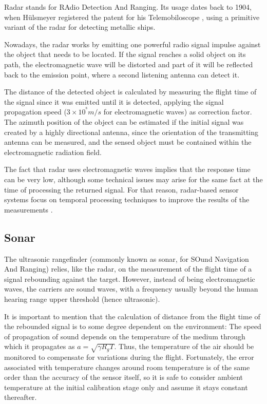 Radar stands for RAdio Detection And Ranging.
Its usage dates back to 1904, when H\"ulsmeyer registered the patent for his Telemobiloscope \cite{hulsmeyer1904}, using a primitive variant of the radar for detecting metallic ships.

Nowadays, the radar works by emitting one powerful radio signal impulse against the object that needs to be located.
If the signal reaches a solid object on its path, the electromagnetic wave will be distorted and part of it will be reflected back to the emission point, where a second listening antenna can detect it.

The distance of the detected object is calculated by measuring the flight time of the signal since it was emitted until it is detected, applying the signal propagation speed ($3 \times 10^{^8} m/s$ for electromagnetic waves) as correction factor.
The azimuth position of the object can be estimated if the initial signal was created by a highly directional antenna, since the orientation of the transmitting antenna can be measured, and the sensed object must be contained within the electromagnetic radiation field.



The fact that radar uses electromagnetic waves implies that the response time can be very low, although some technical issues may arise for the same fact at the time of processing the returned signal.
For that reason, radar-based sensor systems focus on temporal processing techniques to improve the results of the measurements \cite{krolik2005}.


\subsection{Sonar}

The ultrasonic rangefinder (commonly known as sonar, for SOund Navigation And Ranging) relies, like the radar, on the measurement of the flight time of a signal rebounding against the target.
However, instead of being electromagnetic waves, the carriers are sound waves, with a frequency usually beyond the human hearing range upper threshold (hence ultrasonic).

It is important to mention that the calculation of distance from the flight time of the rebounded signal is to some degree dependent on the environment:
The speed of propagation of sound depends on the temperature of the medium through which it propagates as $a=\sqrt{\gamma R_g T}$.
Thus, the temperature of the air should be monitored to compensate for variations during the flight.
Fortunately, the error associated with temperature changes around room temperature is of the same order than the accuracy of the sensor itself, so it is safe to consider ambient temperature at the initial calibration stage only and assume it stays constant thereafter.

